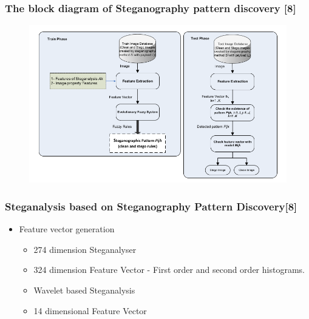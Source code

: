 \documentclass{beamer} %
\theoremstyle{definition} %
\begin{document}
\begin{frame}
\frametitle{The block diagram of Steganography pattern discovery [8]  }
\begin{figure}
\includegraphics[scale=0.37]{spdBlockDiag.png}
\end{figure}
\end{frame}

\begin{frame}
\frametitle{Steganalysis based on Steganography Pattern Discovery[8]}
\begin{itemize}
	\item Feature vector generation
	\begin{itemize}
	\item 274 dimension Steganalyser 
	\item 324 dimension Feature Vector - First order and second order histograms.
	\item Wavelet based Steganalysis 
	\item 14 dimensional Feature Vector 
	\end{itemize}
\end{itemize}
\end{frame}
\end{document}
